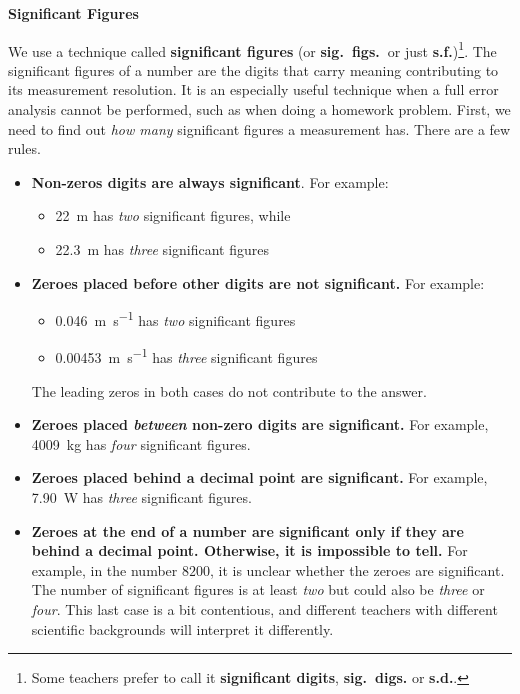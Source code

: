 \documentclass{../../oss-handout}
\begin{document}
\begin{center}
  \textbf{Significant Figures}
\end{center}
We use a technique called \textbf{significant figures} (or
\textbf{sig.\ figs.\ }or just \textbf{s.f.})\footnote{Some teachers prefer to
  call it \textbf{significant digits}, \textbf{sig.\ digs.} or \textbf{s.d.}.}.
The significant figures of a number are the digits that carry meaning
contributing to its measurement resolution. It is an especially useful
technique when a full error analysis cannot be performed, such as when doing a
homework problem. First, we need to find out \emph{how many} significant
figures a measurement has. There are a few rules.
\begin{itemize}
  \item\textbf{Non-zeros digits are always significant}. For example:
    \begin{itemize}[nosep]
    \item\SI{22}{\metre} has \emph{two} significant figures, while
    \item\SI{22.3}{\metre} has \emph{three} significant figures
    \end{itemize}
    \newpage
  \item\textbf{Zeroes placed before other digits are not significant.} For
    example:
    \begin{itemize}[nosep]
    \item\SI{.046}{\metre\per\second} has \emph{two}  significant figures
    \item\SI{.00453}{\metre\per\second} has \emph{three}  significant figures
    \end{itemize}
    The leading zeros in both cases do not contribute to the answer.

  \item\textbf{Zeroes placed \emph{between} non-zero digits are significant.}
    For example, \SI{4009}{\kilo\gram} has \emph{four} significant figures.

  \item\textbf{Zeroes placed behind a decimal point are significant.} For
    example, \SI{7.90}{\watt} has \emph{three} significant figures.

  \item\textbf{Zeroes at the end of a number are significant only if they are
    behind a decimal point. Otherwise, it is impossible to tell.} For example,
    in the number $8200$, it is unclear whether the zeroes are significant. The
    number of significant figures is at least \emph{two} but could also be
    \emph{three} or \emph{four}. This last case is a bit contentious, and
    different teachers with different scientific backgrounds will interpret it
    differently.
\end{itemize}
\end{document}
